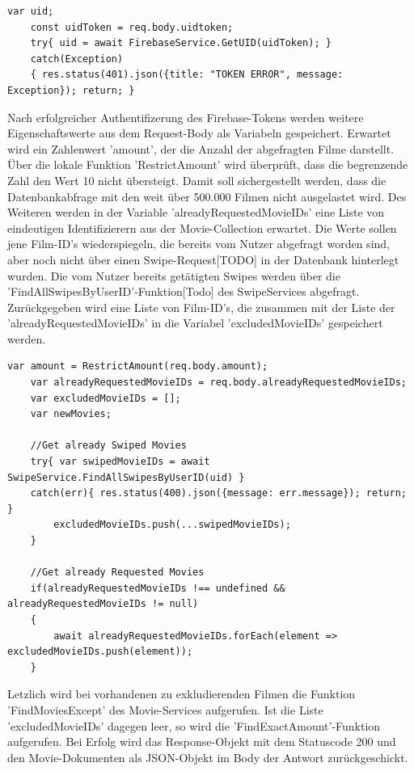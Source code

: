 \begin{lstlisting}[caption=Controller Firebase-Authentifizierung, label=lst:controllerfirebaseauth]
    var uid; 
    const uidToken = req.body.uidtoken;
    try{ uid = await FirebaseService.GetUID(uidToken); }
    catch(Exception)
    { res.status(401).json({title: "TOKEN ERROR", message: Exception}); return; }
\end{lstlisting}

Nach erfolgreicher Authentifizerung des Firebase-Tokens werden weitere Eigenschaftswerte aus dem Request-Body als Variabeln gespeichert. Erwartet wird ein Zahlenwert 'amount', der die Anzahl der abgefragten Filme darstellt. Über die lokale Funktion 'RestrictAmount' wird überprüft, dass die begrenzende Zahl den Wert 10 nicht übersteigt. Damit soll sichergestellt werden, dass die Datenbankabfrage mit den weit über 500.000 Filmen nicht ausgelastet wird. Des Weiteren werden in der Variable 'alreadyRequestedMovieIDs' eine Liste von   eindeutigen Identifizierern aus der Movie-Collection erwartet. Die Werte sollen jene Film-ID's wiederspiegeln, die bereits vom Nutzer abgefragt worden sind, aber noch nicht über einen Swipe-Request[TODO] in der Datenbank hinterlegt wurden. Die vom Nutzer bereits getätigten Swipes werden über die 'FindAllSwipesByUserID'-Funktion[Todo] des SwipeServices abgefragt. Zurück\-gegeben wird eine Liste von Film-ID's, die zusammen mit der Liste der 'alreadyRequestedMovieIDs' in die Variabel 'excludedMovieIDs' gespeichert werden.

\begin{lstlisting}[caption=MovieController - RequestMovie - Excluded Movies, label=lst:MovieControllerExcludedMovies]
    var amount = RestrictAmount(req.body.amount);
    var alreadyRequestedMovieIDs = req.body.alreadyRequestedMovieIDs;
    var excludedMovieIDs = [];
    var newMovies;
    
    //Get already Swiped Movies
    try{ var swipedMovieIDs = await SwipeService.FindAllSwipesByUserID(uid) }
    catch(err){ res.status(400).json({message: err.message}); return; }
        excludedMovieIDs.push(...swipedMovieIDs);
    }

    //Get already Requested Movies
    if(alreadyRequestedMovieIDs !== undefined && alreadyRequestedMovieIDs != null)
    {
        await alreadyRequestedMovieIDs.forEach(element => excludedMovieIDs.push(element));
    }
\end{lstlisting}

Letzlich wird bei vorhandenen zu exkludierenden Filmen die Funktion 'FindMoviesExcept' des Movie-Services aufgerufen.  Ist die Liste 'excludedMovieIDs' dagegen leer, so wird die 'FindExactAmount'-Funktion aufgerufen. Bei Erfolg wird das Response-Objekt mit dem Statuscode 200 und den Movie-Dokumenten als JSON-Objekt im Body der Antwort zurückgeschickt.

